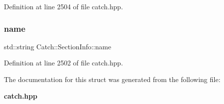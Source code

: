 Definition at line 2504 of file catch.\+hpp.

\mbox{\label{struct_catch_1_1_section_info_a704c8fc662d309137e0d4f199cb7df58}} 
\subsubsection{name}
{\footnotesize\ttfamily std\+::string Catch\+::\+Section\+Info\+::name}



Definition at line 2502 of file catch.\+hpp.



The documentation for this struct was generated from the following file\+:\begin{DoxyCompactItemize}
\item 
\textbf{ catch.\+hpp}\end{DoxyCompactItemize}
